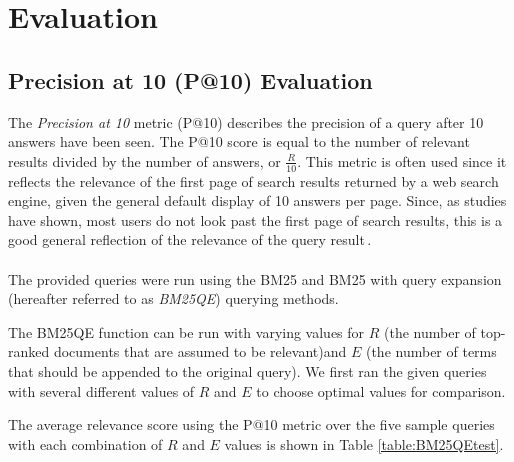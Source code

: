 \setlength{\tabcolsep}{15pt}
\section{Evaluation}
\label{sec:evaluation}

\setlength{\tabcolsep}{5pt}

\subsection{Precision at 10 (P@10) Evaluation}

The \textit{Precision at 10} metric (P@10) describes the precision of a query after 10 answers have been seen. The P@10 score is equal to the number of relevant results divided by the number of answers, or $\frac{R}{10}$. This metric is often used since it reflects the relevance of the first page of search results returned by a web search engine, given the general default display of 10 answers per page. Since, as studies have shown, most users do not look past the first page of search results, this is a good general reflection of the relevance of the query result\,\cite{scholer13eval}\cite[p. 161]{manning2008introduction}.

\paragraph*{}
The provided queries were run using the BM25 and BM25 with query expansion (hereafter referred to as \textit{BM25QE}) querying methods.

The BM25QE function can be run with varying values for $R$ (the number of top-ranked documents that are assumed to be relevant)and $E$ (the number of terms that should be appended to the original query). We first ran the given queries with several different values of $R$ and $E$ to choose optimal values for comparison.

The average relevance score using the P@10 metric over the five sample queries with each combination of $R$ and $E$ values is shown in Table \ref{table:BM25QEtest}.

\begin{centering}
\begin{table}
\caption {Average P@10 score for BM25QE with different combinations of R and E}\label{table:BM25QEtest}
\end{table}
\end{centering}

